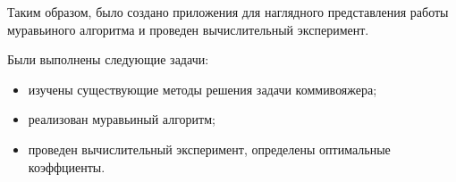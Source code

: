 \newpage
{}

Таким образом, было создано приложения для наглядного представления работы муравьиного алгоритма
и проведен вычислительный эксперимент.

Были выполнены следующие задачи:

\begin{itemize}
    \item изучены существующие методы решения задачи коммивояжера;
    \item реализован муравьиный алгоритм;
    \item проведен вычислительный эксперимент, определены оптимальные коэффциенты.
\end{itemize}

